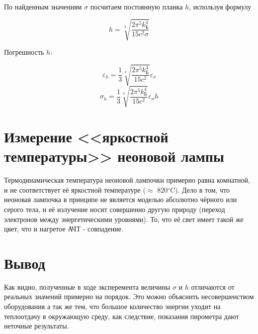 	По найденным значениям $\sigma$ посчитаем постоянную планка $h$, используя формулу

	\[ h = \sqrt[3]{\frac{2 \pi^5 k_{\text{Б}}^4}{15 c^2 \sigma}} \]

	Погрешность $h$:

	\[ \varepsilon_h = \frac{1}{3} \sqrt[3]{\frac{2 \pi^5 k_{\text{Б}}^4}{15 c^2 }} \varepsilon_{\sigma} \]
	\[ \sigma_h = \frac{1}{3} \sqrt[3]{\frac{2 \pi^5 k_{\text{Б}}^4}{15 c^2 }} \varepsilon_{\sigma} h \]

	\begin{center}
	\end{center}

	\section*{Измерение <<яркостной температуры>> неоновой лампы}

	Термодинамическая температура неоновой лампочки примерно равна комнатной, и не соответствует её яркостной температуре ($\approx$ 820$^{\circ}$C). 
	Дело в том, что неоновая лампочка в принципе не является моделью абсолютно чёрного или серого тела, 
	и её излучение носит совершенно другую природу (переход электронов между энергетическими уровнями). 
	То, что её свет имеет такой же цвет, что и нагретое АЧТ - совпадение.

	\section*{Вывод}

	Как видно, полученные в ходе эксперемента величины $\sigma$ и $h$ отличаются от реальных значений примерно на
	порядок. Это можно объяснить несовершенством оборудования а так же тем, что большое количество энергии
	уходит на теплоотдачу в окружающую среду, как следствие, показания пирометра дают неточные результаты.
